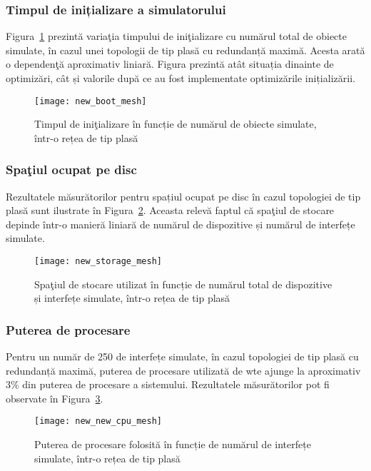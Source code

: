\subsubsection{Timpul de inițializare a simulatorului}

Figura~\ref{fig:new_boot_mesh} prezintă variaţia timpului de iniţializare cu numărul total de obiecte simulate, în cazul unei topologii de tip plasă cu redundanță maximă. Acesta arată o dependenţă aproximativ liniară. Figura prezintă atât situația dinainte de optimizări, cât și valorile după ce au fost implementate optimizările inițializării.

\begin{figure}[h]
	\centering
	\texttt{[image: new\_boot\_mesh]}
	\caption{Timpul de iniţializare în funcție de numărul de obiecte simulate, într-o rețea de tip plasă}
	\label{fig:new_boot_mesh}
\end{figure}

\subsubsection{Spaţiul ocupat pe disc}

Rezultatele măsurătorilor pentru spațiul ocupat pe disc în cazul topologiei de tip plasă sunt ilustrate în Figura~\ref{fig:new_storage_mesh}. Aceasta relevă faptul că spaţiul de stocare depinde într-o manieră liniară de numărul de dispozitive și numărul de interfețe simulate. 

\begin{figure}[h]
	\centering
	\texttt{[image: new\_storage\_mesh]}
	\caption{Spaţiul de stocare utilizat în funcție de numărul total de dispozitive și interfețe simulate, într-o rețea de tip plasă}
	\label{fig:new_storage_mesh}
\end{figure}

\subsubsection{Puterea de procesare}

Pentru un număr de 250 de interfețe simulate, în cazul topologiei de tip plasă cu redundanță maximă, puterea de procesare utilizată de \gls{wte} ajunge la aproximativ 3\% din puterea de procesare a sistemului. Rezultatele măsurătorilor pot fi observate în Figura~\ref{fig:new_cpu_mesh}.

\begin{figure}[hp]
	\centering
	\texttt{[image: new\_new\_cpu\_mesh]}
	\caption{Puterea de procesare folosită în funcție de numărul de interfețe simulate, într-o rețea de tip plasă}
	\label{fig:new_cpu_mesh}
\end{figure}

